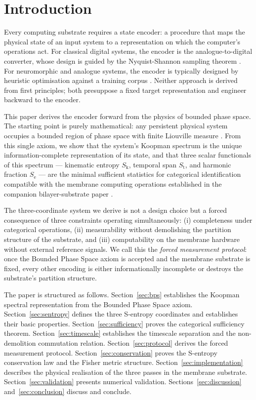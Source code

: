 \documentclass[11pt,twocolumn,a4paper]{article}
\theoremstyle{definition}
\theoremstyle{remark}
\newcommand{\Sk}{S_{\mathrm{k}}}
\newcommand{\St}{S_{\mathrm{t}}}
\newcommand{\Se}{S_{\mathrm{e}}}
\begin{document}
\section{Introduction}
\label{sec:introduction}

Every computing substrate requires a state encoder: a procedure that maps the
physical state of an input system to a representation on which the computer's
operations act. For classical digital systems, the encoder is the
analogue-to-digital converter, whose design is guided by the Nyquist-Shannon
sampling theorem \citep{shannon1949}. For neuromorphic and analogue systems,
the encoder is typically designed by heuristic optimisation against a training
corpus \citep{maass1997}. Neither approach is derived from first principles; both
presuppose a fixed target representation and engineer backward to the encoder.

This paper derives the encoder forward from the physics of bounded phase space.
The starting point is purely mathematical: any persistent physical system occupies
a bounded region of phase space with finite Liouville measure \citep{liouville1838}.
From this single axiom, we show that the system's Koopman spectrum
\citep{koopman1931} is the unique information-complete representation of its state,
and that three scalar functionals of this spectrum --- kinematic entropy $\Sk$,
temporal span $\St$, and harmonic fraction $\Se$ --- are the minimal sufficient
statistics for categorical identification compatible with the membrane computing
operations established in the companion bilayer-substrate paper \citep{companion1}.

The three-coordinate system we derive is not a design choice but a forced
consequence of three constraints operating simultaneously: (i) completeness under
categorical operations, (ii) measurability without demolishing the partition
structure of the substrate, and (iii) computability on the membrane hardware
without external reference signals. We call this the \emph{forced measurement
protocol}: once the Bounded Phase Space axiom is accepted and the membrane
substrate is fixed, every other encoding is either informationally incomplete
or destroys the substrate's partition structure.

The paper is structured as follows. Section~\ref{sec:bps} establishes the
Koopman spectral representation from the Bounded Phase Space axiom.
Section~\ref{sec:sentropy} defines the three S-entropy coordinates and establishes
their basic properties. Section~\ref{sec:sufficiency} proves the categorical
sufficiency theorem. Section~\ref{sec:timescale} establishes the timescale
separation and the non-demolition commutation relation.
Section~\ref{sec:protocol} derives the forced measurement protocol.
Section~\ref{sec:conservation} proves the S-entropy conservation law and the
Fisher metric structure. Section~\ref{sec:implementation} describes the physical
realisation of the three passes in the membrane substrate.
Section~\ref{sec:validation} presents numerical validation.
Sections~\ref{sec:discussion} and~\ref{sec:conclusion} discuss and conclude.
\end{document}
